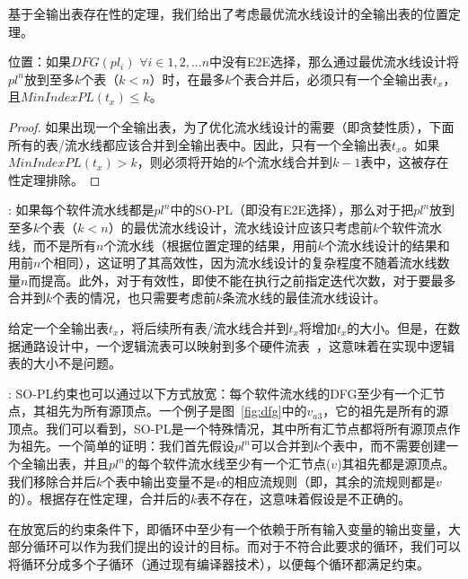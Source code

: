 基于全输出表存在性的定理，我们给出了考虑最优流水线设计的全输出表的位置定理。

\begin{theorem}
位置：如果$DFG(pl_i)$ $\forall i \in 1, 2, ... n$中没有E2E选择，那么通过最优流水线设计将$pl^n$放到至多$k$个表（$k < n$）时，在最多$k$个表合并后，必须只有一个全输出表$t_x$，且$MinIndexPL(t_x) \leq k$。
\end{theorem}

\begin{proof}
如果出现一个全输出表，为了优化流水线设计的需要（即贪婪性质），下面所有的表/流水线都应该合并到全输出表中。因此，只有一个全输出表$t_x$。如果$MinIndexPL(t_x) > k$，则必须将开始的$k$个流水线合并到$k-1$表中，这被存在性定理排除。
\end{proof}


: 如果每个软件流水线都是$pl^n$中的SO-PL（即没有E2E选择），那么对于把$pl^n$放到至多$k$个表（$k < n$）的最优流水线设计，流水线设计应该只考虑前$k$个软件流水线，而不是所有$n$个流水线（根据位置定理的结果，用前$k$个流水线设计的结果和用前$n$个相同），这证明了其高效性，因为流水线设计的复杂程度不随着流水线数量$n$而提高。此外，对于有效性，即使不能在执行之前指定迭代次数，对于要最多合并到$k$个表的情况，也只需要考虑前$k$条流水线的最佳流水线设计。 

给定一个全输出表$t_x$，将后续所有表/流水线合并到$t_x$将增加$t_x$的大小。但是，在数据通路设计中，一个逻辑流表可以映射到多个硬件流表~\cite{rmt}，这意味着在实现中逻辑表的大小不是问题。

: SO-PL约束也可以通过以下方式放宽：每个软件流水线的DFG至少有一个汇节点，其祖先为所有源顶点。一个例子是图~\ref{fig:dfg}中的$v_{a3}$，它的祖先是所有的源顶点。我们可以看到，SO-PL是一个特殊情况，其中所有汇节点都将所有源顶点作为祖先。一个简单的证明：我们首先假设$pl^n$可以合并到$k$个表中，而不需要创建一个全输出表，并且$pl^n$的每个软件流水线至少有一个汇节点($v$)其祖先都是源顶点。我们移除合并后$k$个表中输出变量不是$v$的相应流规则（即，其余的流规则都是$v$的）。根据存在性定理，合并后的$k$表不存在，这意味着假设是不正确的。

在放宽后的约束条件下，即循环中至少有一个依赖于所有输入变量的输出变量，大部分循环可以作为我们提出的设计的目标。而对于不符合此要求的循环，我们可以将循环分成多个子循环（通过现有编译器技术），以便每个循环都满足约束。


